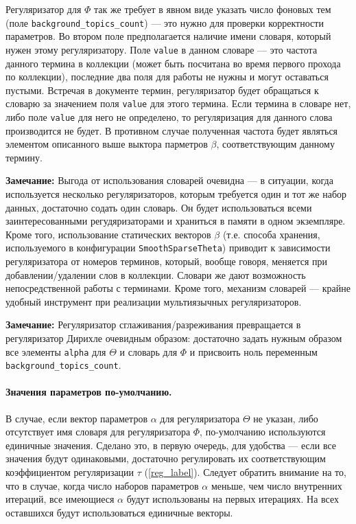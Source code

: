 Регуляризатор для $\Phi$ так же требует в явном виде указать число фоновых тем (поле \verb|background_topics_count|) --- это нужно для проверки корректности параметров. Во втором поле предполагается наличие имени словаря, который нужен этому регуляризатору. Поле \verb|value| в данном словаре --- это частота данного термина в коллекции (может быть посчитана во время первого прохода по коллекции), последние два поля для работы не нужны и могут оставаться пустыми. Встречая в документе термин, регуляризатор будет обращаться к словарю за значением поля \verb|value| для этого термина. Если термина в словаре нет, либо поле \verb|value| для него не определено, то регуляризация для данного слова производится не будет. В противном случае полученная частота будет являться элементом описанного выше выктора парметров $\beta$, соответствующим данному термину.

{\bf Замечание:} Выгода от использования словарей очевидна --- в ситуации, когда используется несколько регуляризаторов, которым требуется один и тот же набор данных, достаточно содать один словарь. Он будет использоваться всеми заинтересованными регудяризаторами и храниться в памяти в одном экземпляре. Кроме того, использование статических векторов $\beta$ (т.е. способа хранения, используемого в конфигурации \verb|SmoothSparseTheta|) приводит к зависимости регуляризатора от номеров терминов, который, вообще говоря, меняется при добавлении/удалении слов в коллекции. Словари же дают возможность непосредственной работы с терминами. Кроме того, механизм словарей --- крайне удобный инструмент при реализации мультиязычных регуляризаторов.

{\bf Замечание:} Регуляризатор сглаживания/разреживания превращается в регуляризатор Дирихле очевидным образом: достаточно задать нужным образом все элементы \verb|alpha| для $\Theta$ и словарь для $\Phi$ и присвоить ноль переменным \verb|background_topics_count|.

\paragraph{Значения параметров по-умолчанию.}\label{note}
 В случае, если вектор параметров $\alpha$ для регуляризатора $\Theta$ не указан, либо отсутствует имя словаря для регуляризатора $\Phi$, по-умолчанию используются единичные значения. Сделано это, в первую очередь, для удобства --- если все значения будут одинаковыми, достаточно регулировать их соответствующим коэффициентом регуляризации $\tau$ (\ref{reg_label}). Следует обратить внимание на то, что в случае, когда число наборов параметров $\alpha$ меньше, чем число внутренних итераций, все имеющиеся $\alpha$ будут использованы на первых итерациях. На всех оставшихся будут использоваться единичные векторы. 

